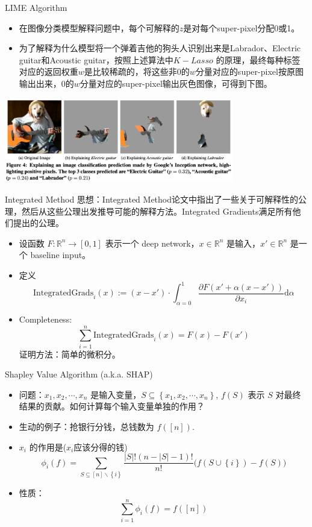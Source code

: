 \begin{frame}{LIME Algorithm}
\begin{itemize}
    \item 在图像分类模型解释问题中，每个可解释的$z$是对每个super-pixel分配0或1。
    \item 为了解释为什么模型将一个弹着吉他的狗头人识别出来是Labrador、Electric guitar和Acoustic guitar，按照上述算法中$K-Lasso$ 的原理，最终每种标签对应的返回权重$w$是比较稀疏的，将这些非$0$的$w$分量对应的super-pixel按原图输出出来，$0$的$w$分量对应的super-pixel输出灰色图像，可得到下图。
\end{itemize}
\begin{center}
    \includegraphics[width=0.75\textwidth]{assets/limee.png}
\end{center}
\end{frame}

\begin{frame}{Integrated Method}
    思想：Integrated Method论文中指出了一些关于可解释性的公理，然后从这些公理出发推导可能的解释方法。Integrated Gradients满足所有他们提出的公理。

    \begin{itemize}
        \item 设函数 $F: \mathbb{R}^{n} \to [0, 1]$ 表示一个 deep network，$x\in \mathbb{R}^{n}$ 是输入，$x'\in \mathbb{R}^{n}$ 是一个 baseline input。
        \item 定义 
        \[
        \text{IntegratedGrads}_i(x) := (x - x') \cdot \int_{\alpha=0}^{1} \frac{\partial F(x' + \alpha(x - x'))}{\partial x_i}  \mathrm{d}\alpha  
        \]
        \item Completeness: 
        \[
        \sum_{i=1}^{n}\text{IntegratedGrads}_i(x) = F(x) - F(x')
        \]
        证明方法：简单的微积分。
    \end{itemize}
\end{frame}

\begin{frame}{Shapley Value Algorithm (a.k.a. SHAP)}
    \begin{itemize}
        \item 问题：$x_1, x_2, \cdots, x_n$ 是输入变量，$S \subseteq \left\{ x_1, x_2, \cdots, x_n \right\} $, $f(S)$ 表示 $S$ 对最终结果的贡献。如何计算每个输入变量单独的作用？
        \item 生动的例子：抢银行分钱，总钱数为 $f([n])$.
        \item $x_i$ 的作用是($x_i$应该分得的钱)
    \[
        \phi_i(f) = \sum_{S \subseteq [n]\backslash \left\{ i \right\}} \frac{\left| S \right| ! \left( n - |S| - 1 \right) !}{n!} \Big( f(S \cup \left\{ i \right\}) - f(S) \Big)
    \]
    \item 性质：
    \[
        \sum_{i=1}^{n} \phi_i(f) = f([n])  
    \]
    \end{itemize}
\end{frame}
